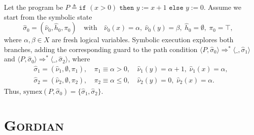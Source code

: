 \documentclass[acmsmall,screen,nonacm]{acmart}
\newcommand{\projName}{\textsc{Gordian}\xspace}
\theoremstyle{definition}
\begin{document}
\begin{example}
Let the program be $P \triangleq \texttt{if }(x > 0)\texttt{ then }y := x+1\texttt{ else }y := 0$. Assume we start from the symbolic state
\[
\hat\sigma_0=(\hat\nu_0,\hat h_0,\pi_0)
\quad\text{with}\quad
\hat\nu_0(x)=\alpha,\;\hat\nu_0(y)=\beta,\;\hat h_0=\emptyset,\;\pi_0=\top,
\]
where $\alpha,\beta\in X$ are fresh logical variables. Symbolic execution explores both branches, adding the corresponding guard to the path condition $\langle P,\hat\sigma_0\rangle \Rightarrow^{*} \langle \_,\hat\sigma_1\rangle$ and $\langle P,\hat\sigma_0\rangle \Rightarrow^{*} \langle \_,\hat\sigma_2\rangle$, where
\begin{align*}
&\hat\sigma_1 = (\hat\nu_1,\emptyset,\pi_1),
\quad
\pi_1 \equiv \alpha>0,
\quad
\hat\nu_1(y)=\alpha+1,\;\hat\nu_1(x)=\alpha,\\
&\hat\sigma_2 = (\hat\nu_2,\emptyset,\pi_2),
\quad
\pi_2 \equiv \alpha\le 0,
\quad
\hat\nu_2(y)=0,\;\hat\nu_2(x)=\alpha.
\end{align*}
Thus, $\mathrm{symex}(P,\hat\sigma_0)=\{\hat\sigma_1,\hat\sigma_2\}$.
\end{example}

\section{\projName}
\end{document}
